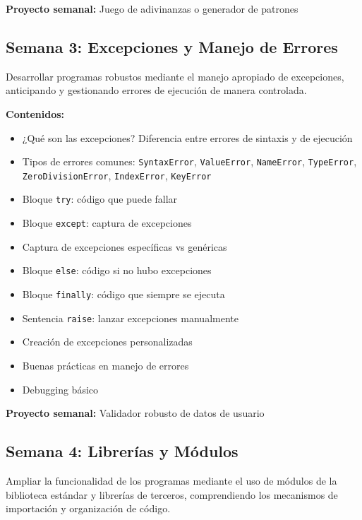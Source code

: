 \documentclass[12pt,letterpaper]{article}
\begin{document}
\textbf{Proyecto semanal:} Juego de adivinanzas o generador de patrones

\subsection{Semana 3: Excepciones y Manejo de Errores}

\begin{objetivobox}
Desarrollar programas robustos mediante el manejo apropiado de excepciones, anticipando y gestionando errores de ejecución de manera controlada.
\end{objetivobox}

\textbf{Contenidos:}
\begin{itemize}[leftmargin=*]
    \item ¿Qué son las excepciones? Diferencia entre errores de sintaxis y de ejecución
    \item Tipos de errores comunes: \texttt{SyntaxError}, \texttt{ValueError}, \texttt{NameError}, \texttt{TypeError}, \texttt{ZeroDivisionError}, \texttt{IndexError}, \texttt{KeyError}
    \item Bloque \texttt{try}: código que puede fallar
    \item Bloque \texttt{except}: captura de excepciones
    \item Captura de excepciones específicas vs genéricas
    \item Bloque \texttt{else}: código si no hubo excepciones
    \item Bloque \texttt{finally}: código que siempre se ejecuta
    \item Sentencia \texttt{raise}: lanzar excepciones manualmente
    \item Creación de excepciones personalizadas
    \item Buenas prácticas en manejo de errores
    \item Debugging básico
\end{itemize}

\textbf{Proyecto semanal:} Validador robusto de datos de usuario

\subsection{Semana 4: Librerías y Módulos}

\begin{objetivobox}
Ampliar la funcionalidad de los programas mediante el uso de módulos de la biblioteca estándar y librerías de terceros, comprendiendo los mecanismos de importación y organización de código.
\end{objetivobox}
\end{document}
